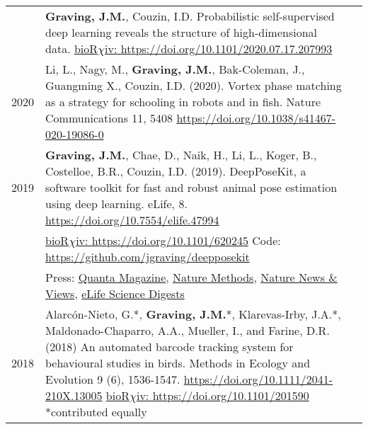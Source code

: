 \documentclass[letterpaper,10pt,oneside]{article}
\begin{document}
\begin{small}
\begin{longtable}{@{} l p{5.3in}l}
& \textbf{Graving, J.M.}, Couzin, I.D.  Probabilistic self-supervised deep learning reveals the structure of high-dimensional data. \vspace{1mm} \href{https://doi.org/10.1101/2020.07.17.207993}{bioR$\chi$iv: https://doi.org/10.1101/2020.07.17.207993} \\
\large{2020}
& Li, L., Nagy, M., \textbf{Graving, J.M.}, Bak-Coleman, J., Guangming X., Couzin, I.D. (2020). Vortex phase matching as a strategy for schooling in robots and in fish. Nature Communications 11, 5408 \href{https://doi.org/10.1038/s41467-020-19086-0 }{https://doi.org/10.1038/s41467-020-19086-0} \vspace{1mm} \\
\large{2019}
 &\textbf{Graving, J.M.}, Chae, D., Naik, H., Li, L., Koger, B., Costelloe, B.R., Couzin, I.D. (2019). DeepPoseKit, a software toolkit for fast and robust animal pose estimation using deep learning. eLife, 8. \href{https://doi.org/10.7554/elife.47994}{https://doi.org/10.7554/elife.47994}\\ &\href{https://doi.org/10.1101/620245}{bioR$\chi$iv: https://doi.org/10.1101/620245} Code: \href{https://github.com/jgraving/deepposekit}{ https://github.com/jgraving/deepposekit} \\
 &Press: \href{https://www.quantamagazine.org/to-decode-the-brain-scientists-automate-the-study-of-behavior-20191210/}{Quanta Magazine}, 
 \href{https://doi.org/10.1038/s41592-019-0678-2}{Nature Methods},
 \href{https://doi.org/10.1038/d41586-019-02942-5}{Nature News \& Views},
 \href{https://elifesciences.org/digests/47994/machine-learning-animal-poses-to-understand-behavior}{eLife Science Digests}
 \vspace{1mm} \\
\large{2018}
& Alarc\'{o}n-Nieto, G.*, \textbf{Graving, J.M.}*, Klarevas-Irby, J.A.*, Maldonado-Chaparro, A.A., Mueller, I., and Farine, D.R. (2018) An automated barcode tracking system for behavioural studies in birds. Methods in Ecology and Evolution 9 (6), 1536-1547. \href{https://doi.org/10.1111/2041-210X.13005}{https://doi.org/10.1111/2041-210X.13005} \href{https://doi.org/10.1101/201590}{bioR$\chi$iv: https://doi.org/10.1101/201590}  \small{*contributed equally}  \vspace{1mm} \\

\end{longtable}
\end{small}
\end{document}
